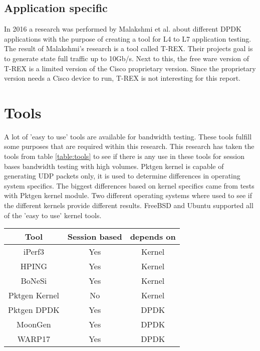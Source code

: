 \subsection{Application specific}
In 2016 a research was performed by Malakshmi et al. \cite{mahalakshmi2016study} about different DPDK applications with the purpose of creating a tool for L4 to L7 application testing. 
The result of Malakshmi's research is a tool called T-REX. Their projects goal is to generate state full traffic up to 10Gb/s. Next to this, the free ware version of T-REX is a limited version of the Cisco proprietary version. Since the proprietary version needs a Cisco device to run, T-REX is not interesting for this report.

\section{Tools}\label{sec:tools}
A lot of 'easy to use' tools are available for bandwidth testing. These tools fulfill some purposes that are required within this research.
This research has taken the tools from table \ref{table:tools} to see if there is any use in these tools for session bases bandwidth testing with high volumes.
Pktgen kernel is capable of generating UDP packets only, it is used to determine differences in operating system specifics. The biggest differences based on kernel specifics came from tests with Pktgen kernel module.
Two different operating systems where used to see if the different kernels provide different results. FreeBSD and Ubuntu supported all of the 'easy to use' kernel tools.

\begin{table*}[ht]
\centering
\begin{tabular}{|c|c|c|} \hline
\textbf{Tool} & \textbf{Session based} & \textbf{depends on} \\ \hline
iPerf3\cite{iperf} & Yes & Kernel  \\ \hline
HPING\cite{hping}  & Yes & Kernel \\ \hline
BoNeSi\cite{bonesi} & Yes & Kernel \\ \hline
Pktgen Kernel\cite{pktgen-kernel} & No & Kernel \\ \hline
Pktgen DPDK\cite{pktgen-dpdk} & Yes & DPDK \\ \hline
MoonGen\cite{moongen} & Yes & DPDK \\ \hline
WARP17\cite{warp} & Yes & DPDK \\ \hline
\end{tabular}
\caption{available tools}
\label{table:tools}
\end{table*} 

